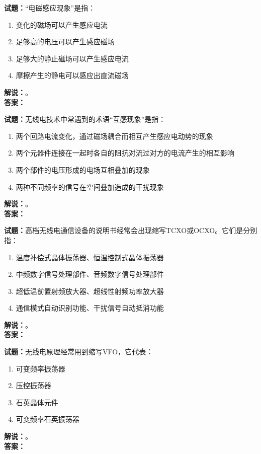 \documentclass{ctexbook}
\begin{document}
\bigskip




\noindent\textbf{试题：}“电磁感应现象”是指：
\begin{enumerate}[leftmargin=3em]
\item 变化的磁场可以产生感应电流
\item 足够高的电压可以产生感应磁场
\item 足够大的静止磁场可以产生感应电流
\item 摩擦产生的静电可以感应出直流磁场
\end{enumerate}
\noindent\textbf{解说：}\textbf{}。\\\noindent\textbf{答案：}

\bigskip




\noindent\textbf{试题：}无线电技术中常遇到的术语“互感现象”是指：
\begin{enumerate}[leftmargin=3em]
\item 两个回路电流变化，通过磁场耦合而相互产生感应电动势的现象
\item 两个元器件连接在一起时各自的阻抗对流过对方的电流产生的相互影响
\item 两个部件的电压形成的电场互相叠加的现象
\item 两种不同频率的信号在空间叠加造成的干扰现象
\end{enumerate}
\noindent\textbf{解说：}\textbf{}。\\\noindent\textbf{答案：}

\bigskip




\noindent\textbf{试题：}高档无线电通信设备的说明书经常会出现缩写TCXO或OCXO。它们是分别指：
\begin{enumerate}[leftmargin=3em]
\item 温度补偿式晶体振荡器、恒温控制式晶体振荡器
\item 中频数字信号处理部件、音频数字信号处理部件
\item 超低温前置射频放大器、超线性射频功率放大器
\item 通信模式自动识别功能、干扰信号自动抵消功能
\end{enumerate}
\noindent\textbf{解说：}\textbf{}。\\\noindent\textbf{答案：}

\bigskip




\noindent\textbf{试题：}无线电原理经常用到缩写VFO，它代表：
\begin{enumerate}[leftmargin=3em]
\item 可变频率振荡器
\item 压控振荡器
\item 石英晶体元件
\item 可变频率石英振荡器
\end{enumerate}
\noindent\textbf{解说：}\textbf{}。\\\noindent\textbf{答案：}
\end{document}
